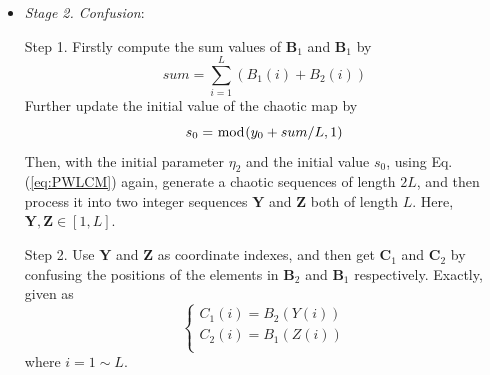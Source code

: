 \documentclass[final,3p,times,twocolumn]{elsarticle}
\begin{document}
\begin{itemize}
	Step 2. Get $\bm{B}_{1}$ by performing the bitwise XOR operations between $\bm{A}_{11}$, $\bm{A}_{2}$ and $\bm{b}_{1}$, given as
	\begin{equation}
	\left\{ \begin{array}{l}
	B_1(1) = A_{11}(1) \oplus A_{11}(L) \oplus A_{2}(1) \oplus b_{1}(1)\\
	B_1(i) = A_{11}(i) \oplus A_{11}(i-1) \oplus A_{2}(i) \oplus b_{1}(i)
	\end{array} \right.
	\label{eq:A11_to_B1}
	\end{equation}
	where $i=2 \sim L$.
	
	Step 3. Like Step 1, firstly compute the sum values $sum_2$ of $\bm{B}_1$ as
	\begin{equation}
	sum_2 = \sum\limits_{i= 1}^{L} B_1(i)
	\label{eq:sum2}
	\end{equation}
	Then , get $\bm{A}_{22}$ cyclic right shifting $\bm{A}_2$ with $sum_2$ bits.
	
	Step 4. Similar to Step 2, obtain $\bm{B}_{2}$ from $\bm{A}_{22}$, $\bm{B}_{1}$ and $\bm{b}_{2}$, modeled by
	\begin{equation}
	\left\{ \begin{array}{l}
	B_2(1) = A_{22}(1) \oplus A_{22}(L) \oplus B_{1}(1) \oplus b_{2}(1)\\
	B_2(i) = A_{22}(i) \oplus A_{22}(i-1) \oplus B_{1}(i) \oplus b_{2}(i)
	\end{array} \right.
	\label{eq:B2_diffusion}
	\end{equation}
	where $i=2 \sim L$.
%	
	\item \emph{Stage 2. Confusion}:
	
	Step 1. Firstly compute the sum values of $\bm{B}_1$ and $\bm{B}_1$ by
	\begin{equation}
	sum = \sum\limits_{i= 1}^{L} (B_1(i)+B_2(i))
	\label{eq:sum3}
	\end{equation}
	Further update the initial value of the chaotic map by
	\begin{equation}
	s_0 = \bmod(y_0+sum/L,1)\\
	\label{eq:update_y0}
	\end{equation}
	Then, with the initial parameter $\eta_2$ and the initial value $s_0$,  using Eq. (\ref{eq:PWLCM}) again, generate a chaotic sequences of length $2L$, and then process it into two integer sequences $\bm{Y}$ and $\bm{Z}$ both of length $L$. Here, $\bm{Y},\bm{Z} \in [1,L]$.
	
	Step 2. Use $\bm{Y}$ and $\bm{Z}$ as coordinate indexes, and then get $\bm{C}_1$ and $\bm{C}_2$ by confusing the positions of the elements in $\bm{B}_2$ and $\bm{B}_1$ respectively. Exactly, given as
	\begin{equation}
	\left\{ \begin{array}{l}
	C_1(i) = B_2(Y(i))\\
	C_2(i) = B_1(Z(i))\\
	\end{array} \right.
	\label{eq:confusion}
	\end{equation}
	where $i=1 \sim L$. 
	

\end{itemize}
\end{document}
